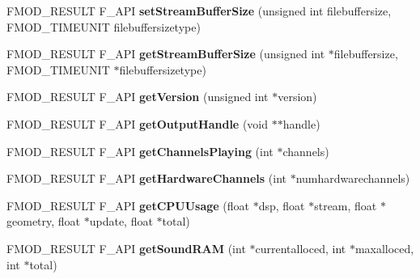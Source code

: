 \begin{DoxyCompactItemize}
\item 
\hypertarget{class_f_m_o_d_1_1_system_a3a1af0fad360c049a38df4abcb14380c}{F\-M\-O\-D\-\_\-\-R\-E\-S\-U\-L\-T F\-\_\-\-A\-P\-I {\bfseries set\-Stream\-Buffer\-Size} (unsigned int filebuffersize, F\-M\-O\-D\-\_\-\-T\-I\-M\-E\-U\-N\-I\-T filebuffersizetype)}\label{class_f_m_o_d_1_1_system_a3a1af0fad360c049a38df4abcb14380c}

\item 
\hypertarget{class_f_m_o_d_1_1_system_a363f5ab0586dd5a10e091986fc2e6a3f}{F\-M\-O\-D\-\_\-\-R\-E\-S\-U\-L\-T F\-\_\-\-A\-P\-I {\bfseries get\-Stream\-Buffer\-Size} (unsigned int $\ast$filebuffersize, F\-M\-O\-D\-\_\-\-T\-I\-M\-E\-U\-N\-I\-T $\ast$filebuffersizetype)}\label{class_f_m_o_d_1_1_system_a363f5ab0586dd5a10e091986fc2e6a3f}

\item 
\hypertarget{class_f_m_o_d_1_1_system_ac248a1234309ccb8be4c69f6b1a8d07e}{F\-M\-O\-D\-\_\-\-R\-E\-S\-U\-L\-T F\-\_\-\-A\-P\-I {\bfseries get\-Version} (unsigned int $\ast$version)}\label{class_f_m_o_d_1_1_system_ac248a1234309ccb8be4c69f6b1a8d07e}

\item 
\hypertarget{class_f_m_o_d_1_1_system_a0bd90d8ae95bad9f2cca9658b73da96d}{F\-M\-O\-D\-\_\-\-R\-E\-S\-U\-L\-T F\-\_\-\-A\-P\-I {\bfseries get\-Output\-Handle} (void $\ast$$\ast$handle)}\label{class_f_m_o_d_1_1_system_a0bd90d8ae95bad9f2cca9658b73da96d}

\item 
\hypertarget{class_f_m_o_d_1_1_system_a5188b4b34e150daf4cc64dde24ad1c1c}{F\-M\-O\-D\-\_\-\-R\-E\-S\-U\-L\-T F\-\_\-\-A\-P\-I {\bfseries get\-Channels\-Playing} (int $\ast$channels)}\label{class_f_m_o_d_1_1_system_a5188b4b34e150daf4cc64dde24ad1c1c}

\item 
\hypertarget{class_f_m_o_d_1_1_system_a25278fabe9e4e95e676e3b56921efa41}{F\-M\-O\-D\-\_\-\-R\-E\-S\-U\-L\-T F\-\_\-\-A\-P\-I {\bfseries get\-Hardware\-Channels} (int $\ast$numhardwarechannels)}\label{class_f_m_o_d_1_1_system_a25278fabe9e4e95e676e3b56921efa41}

\item 
\hypertarget{class_f_m_o_d_1_1_system_a3faa4a44c39af4c49f5812bb000c43d4}{F\-M\-O\-D\-\_\-\-R\-E\-S\-U\-L\-T F\-\_\-\-A\-P\-I {\bfseries get\-C\-P\-U\-Usage} (float $\ast$dsp, float $\ast$stream, float $\ast$geometry, float $\ast$update, float $\ast$total)}\label{class_f_m_o_d_1_1_system_a3faa4a44c39af4c49f5812bb000c43d4}

\item 
\hypertarget{class_f_m_o_d_1_1_system_a406c76a44c183773616569d2cdec2036}{F\-M\-O\-D\-\_\-\-R\-E\-S\-U\-L\-T F\-\_\-\-A\-P\-I {\bfseries get\-Sound\-R\-A\-M} (int $\ast$currentalloced, int $\ast$maxalloced, int $\ast$total)}\label{class_f_m_o_d_1_1_system_a406c76a44c183773616569d2cdec2036}


\end{DoxyCompactItemize}
